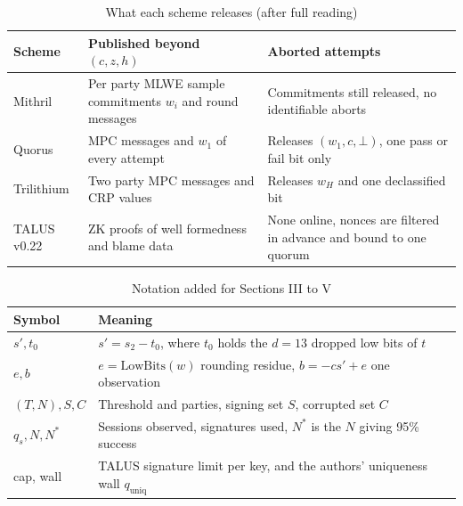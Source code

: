 \documentclass[10pt,conference,a4paper]{IEEEtran}
\newcommand{\LB}{\mathrm{LowBits}}
\begin{document}
\begin{table}[t]
\caption{What each scheme releases (after full reading)}\label{tab:transcript}
\centering\footnotesize
\begin{tabularx}{\columnwidth}{@{}lXX@{}}
\toprule
Scheme & Published beyond $(c,z,h)$ & Aborted attempts\\
\midrule
Mithril & Per party MLWE sample commitments $w_i$ and round messages & Commitments still released, no identifiable aborts\\
Quorus & MPC messages and $w_1$ of every attempt & Releases $(w_1,c,\bot)$, one pass or fail bit only\\
Trilithium & Two party MPC messages and CRP values & Releases $w_H$ and one declassified bit\\
TALUS v0.22 & ZK proofs of well formedness and blame data & None online, nonces are filtered in advance and bound to one quorum\\
\bottomrule
\end{tabularx}
\end{table}

\begin{table}[t]
\caption{Notation added for Sections III to V}\label{tab:notation}
\centering\footnotesize
\begin{tabularx}{\columnwidth}{@{}lX@{}}
\toprule
Symbol & Meaning\\
\midrule
$s',t_0$ & $s'=s_2-t_0$, where $t_0$ holds the $d=13$ dropped low bits of $t$\\
$e,b$ & $e=\LB(w)$ rounding residue, $b=-cs'+e$ one observation\\
$(T,N),S,C$ & Threshold and parties, signing set $S$, corrupted set $C$\\
$q_s,N,N^*$ & Sessions observed, signatures used, $N^*$ is the $N$ giving 95\% success\\
cap, wall & TALUS signature limit per key, and the authors' uniqueness wall $q_\mathrm{uniq}$\\
\bottomrule
\end{tabularx}
\end{table}
\end{document}
